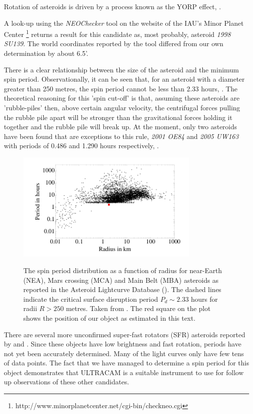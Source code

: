 Rotation of asteroids is driven by a process known as the YORP effect, \citep{yorpeffect}. 

A look-up using the \emph{NEOChecker} tool on the website of the IAU's Minor Planet Center \footnote{http://www.minorplanetcenter.net/cgi-bin/checkneo.cgi} returns a result for this candidate as, most probably, asteroid \emph{1998 SU139}. The world coordinates reported by the tool differed from our own determination by about 6.5'. 

There is a clear relationship between the size of the asteroid and the minimum spin period. Observationally, it can be seen that, for an asteroid with a diameter greater than 250 metres, the spin period cannot be less than 2.33 hours, \citep{Jacobson2014}. The theoretical reasoning for this 'spin cut-off'  is that, assuming these asteroids are 'rubble-piles' then, above certain angular velocity, the centrifugal forces pulling the rubble pile apart will be stronger than the gravitational forces holding it together and the rubble pile will break up. At the moment, only two asteroids have been found that are exceptions to this rule, \emph{2001 OE84} and \emph{2005 UW163} with periods of 0.486 and 1.290 hours respectively, \citep{Chang2014}. 

  \begin{figure}
    \center
    \includegraphics[width=90mm]{images/jacobson-asteroid-rotation-dot.png} 
    \label{fig:2005-05-10-run012}
    \caption{The spin period distribution as a function of radius for near-Earth (NEA), Mars crossing (MCA) and Main Belt (MBA) asteroids as reported in the Asteroid Lightcurve Database (\cite{2009Icar..202..134W}). The dashed lines indicate the critical surface disruption period $P_d \sim 2.33$ hours for radii $R > 250$ metres. Taken from \cite{Jacobson2014}. The red square on the plot shows the position of our object as estimated in this text.}
  \end{figure}
  

There are several more unconfirmed super-fast rotators (SFR) asteroids reported by \citet{Masiero2009} and \citet{Dermawan2011}. Since these objects have low brightness and fast rotation, periods have not yet been accurately determined. Many of the light curves only have few tens of data points. The fact that we have managed to determine a spin period for this object demonstrates that ULTRACAM is a suitable instrument to use for follow up observations of these other candidates.  

